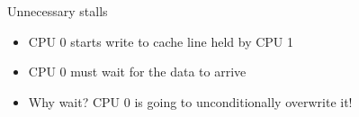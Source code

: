 \begin{frame}[t,fragile]{Unnecessary stalls}


\begin{itemize}
    \item CPU 0 starts write to cache line held by CPU 1
    \item CPU 0 must wait for the data to arrive
    \pause
    \item Why wait? CPU 0 is going to unconditionally overwrite it!
\end{itemize}

\end{frame}


